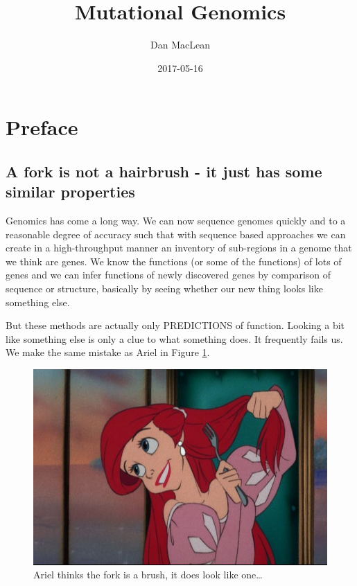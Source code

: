\documentclass[12pt,]{book}
\title{Mutational Genomics}
\author{Dan MacLean}
\date{2017-05-16}
\begin{document}
\maketitle

{
\setcounter{tocdepth}{1}
\tableofcontents
}
\listoffigures
\chapter*{Preface}\label{preface}

\section*{A fork is not a hairbrush - it just has some similar
properties}\label{a-fork-is-not-a-hairbrush---it-just-has-some-similar-properties}

Genomics has come a long way. We can now sequence genomes quickly and to
a reasonable degree of accuracy such that with sequence based approaches
we can create in a high-throughput manner an inventory of sub-regions in
a genome that we think are genes. We know the functions (or some of the
functions) of lots of genes and we can infer functions of newly
discovered genes by comparison of sequence or structure, basically by
seeing whether our new thing looks like something else.

But these methods are actually only PREDICTIONS of function. Looking a
bit like something else is only a clue to what something does. It
frequently fails us. We make the same mistake as Ariel in Figure
\ref{fig:ariel}.




\begin{figure}
\includegraphics[width=4.8in]{assets/ariel} \caption{Ariel thinks the fork is a brush, it does look like
one\ldots{}}\label{fig:ariel}
\end{figure}
\end{document}
